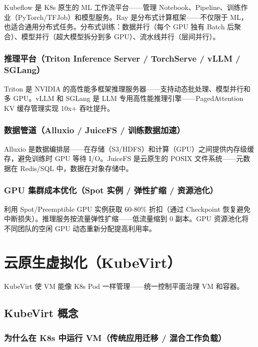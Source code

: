 \documentclass[12pt,UTF8]{ctexbook}
\begin{document}
Kubeflow 是 K8s 原生的 ML 工作流平台——管理 Notebook、Pipeline、训练作业（PyTorch/TFJob）和模型服务。Ray 是分布式计算框架——不仅限于 ML，也适合通用分布式任务。分布式训练：数据并行（每个 GPU 独有 Batch 后聚合）、模型并行（超大模型拆分到多 GPU）、流水线并行（层间并行）。

    \subsection{推理平台（Triton Inference Server / TorchServe / vLLM / SGLang）}

Triton 是 NVIDIA 的高性能多框架推理服务器——支持动态批处理、模型并行和多 GPU。vLLM 和 SGLang 是 LLM 专用高性能推理引擎——PagedAttention KV 缓存管理实现 10x+ 吞吐提升。

    \subsection{数据管道（Alluxio / JuiceFS / 训练数据加速）}

Alluxio 是数据编排层——在存储（S3/HDFS）和计算（GPU）之间提供内存级缓存，避免训练时 GPU 等待 I/O。JuiceFS 是云原生的 POSIX 文件系统——元数据在 Redis/SQL 中，数据在对象存储中。

    \subsection{GPU 集群成本优化（Spot 实例 / 弹性扩缩 / 资源池化）}

利用 Spot/Preemptible GPU 实例获取 60-80\% 折扣（通过 Checkpoint 恢复避免中断损失）。推理服务按流量弹性扩缩——低流量缩到 0 副本。GPU 资源池化将不同团队的空闲 GPU 动态重新分配提高利用率。


\chapter{云原生虚拟化（KubeVirt）}
\label{chap:kubevirt}

KubeVirt 使 VM 能像 K8s Pod 一样管理——统一控制平面治理 VM 和容器。

  \section{KubeVirt 概念}
    \subsection{为什么在 K8s 中运行 VM（传统应用迁移 / 混合工作负载）}
\end{document}
